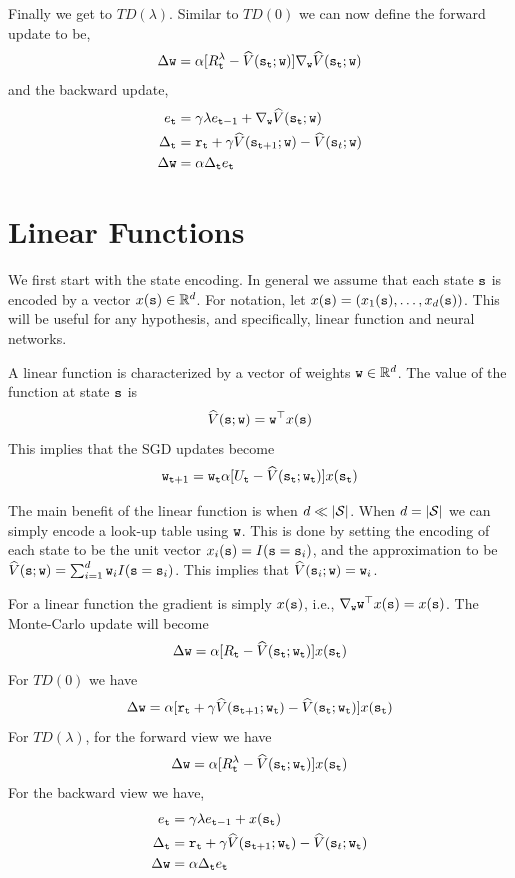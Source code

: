 Finally we get to $TD(\lambda)$. Similar to $TD(0)$ we can now
define the forward update to be,
\[
\Delta {\tt w} =  \alpha[R^\lambda_{\tt t}
-\widehat{V}({\tt s}_{\tt t};{\tt w})]\nabla_{\tt w}
\widehat{V}({\tt s}_{\tt t};{\tt w})
\]
and the backward update,
\begin{align*}
e_{\tt t} &= \gamma\lambda e_{{\tt t}-1}+\nabla_{\tt w} \widehat{V}({\tt s}_{\tt t};{\tt w})\\
\Delta_{\tt t} &= {\tt r}_{\tt t}+\gamma \widehat{V}({\tt s}_{{\tt t}+1};{\tt w})-\widehat{V}({\tt s}_{t};{\tt w})\\
\Delta {\tt w} &= \alpha \Delta_{\tt t} e_{\tt t}
\end{align*}


\section{Linear Functions}

We first start with the state encoding. In general we assume that
each state ${\tt s}$ is encoded by a vector $x({\tt s})\in
\mathbb{R}^d$. For notation, let $x({\tt s})=(x_1({\tt s}),\ldots ,
x_d({\tt s}))$. This will be useful for any hypothesis, and
specifically, linear function and neural networks.

A linear function is characterized by a vector of weights
${\tt w}\in \mathbb{R}^d$. The value of the function at state
${\tt s}$ is
\[
\widehat{V}({\tt s};{\tt w})={\tt w}^\top x({\tt s})
\]
This implies that the SGD updates become
\[
{\tt w}_{{\tt t}+1}={\tt w}_{\tt t} \alpha[U_{\tt t}
-\widehat{V}({\tt s}_{\tt t};{\tt w}_{\tt t})]x({\tt s}_{\tt t})
\]

The main benefit of the linear function is when $d\ll |\mathcal{S}|$.
When $d=|\mathcal{S}|$ we can simply encode a look-up table using
${\tt w}$. This is done by setting the encoding of each state to be
the unit vector $x_i({\tt s})=I({\tt s}={\tt s}_i)$, and the
approximation to be $\widehat{V}({\tt s};{\tt w})=\sum_{i=1}^d
{\tt w}_i I({\tt s}={\tt s}_i)$. This implies that
$\widehat{V}({\tt s}_i;{\tt w})={\tt w}_i$.

For a linear function the gradient is simply $x({\tt s})$, i.e.,
$\nabla_{\tt w} {\tt w}^\top x({\tt s})=x({\tt s})$. The Monte-Carlo
update will become
\[
\Delta {\tt w}=
\alpha[R_{\tt t}-\widehat{V}({\tt s}_{\tt t};{\tt w}_{\tt t})]x({\tt s}_{\tt t})
\]
For $TD(0)$ we have
\[
\Delta {\tt w}= \alpha[{\tt r}_{\tt t}+\gamma
\widehat{V}({\tt s}_{{\tt t}+1};{\tt w}_{\tt t})-\widehat{V}({\tt s}_{\tt t};{\tt w}_{\tt t})]x({\tt s}_{\tt t})
\]
For $TD(\lambda)$, for the forward view we have
\[
\Delta {\tt w}=
\alpha[R^\lambda_{\tt t}-\widehat{V}({\tt s}_{\tt t};{\tt w}_{\tt t})]x({\tt s}_{\tt t})
\]
For the backward view we have,
\begin{align*}
e_{\tt t} &= \gamma\lambda e_{{\tt t}-1}+x({\tt s}_{\tt t})\\
\Delta_{\tt t} &= {\tt r}_{\tt t}+\gamma \widehat{V}({\tt s}_{{\tt t}+1};{\tt w}_{\tt t})-\widehat{V}({\tt s}_{t};{\tt w}_{\tt t})\\
\Delta {\tt w} &= \alpha \Delta_{\tt t} e_{\tt t}
\end{align*}


